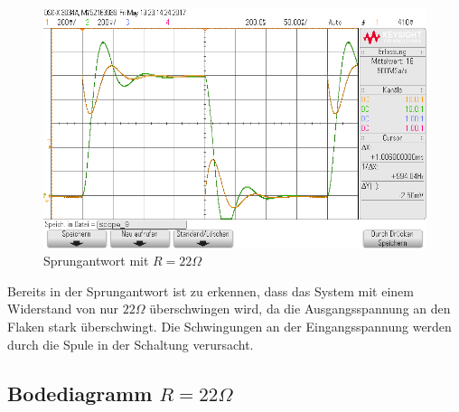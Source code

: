 \begin{figure}[H]
  \begin{center}
    \includegraphics[width=1\textwidth]{./Oszi_Bilder/RLC_Sprung_22.png}
    \caption{Sprungantwort mit $R=22\Omega$}
  \end{center}
\end{figure}
\noindent
Bereits in der Sprungantwort ist zu erkennen, dass das System mit einem Widerstand von nur $22\Omega$ \"uberschwingen wird, da die Ausgangsspannung an den Flaken stark \"uberschwingt. Die Schwingungen an der Eingangsspannung werden durch die Spule in der Schaltung verursacht.

\subsection{Bodediagramm $R=22\Omega$}

